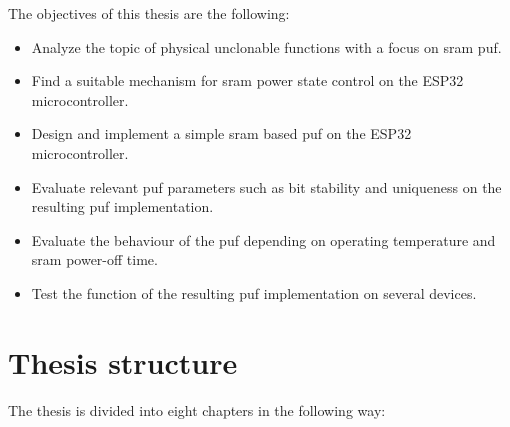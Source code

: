 The objectives of this thesis are the following:

\begin{itemize}
    \item Analyze the topic of physical unclonable functions with a focus on \gls{sram} \gls{puf}.
    \item Find a suitable mechanism for \gls{sram} power state control on the ESP32 microcontroller.
    \item Design and implement a simple \gls{sram} based \gls{puf} on the ESP32 microcontroller.
    \item Evaluate relevant \gls{puf} parameters such as bit stability and uniqueness on the resulting \gls{puf} implementation.
    \item Evaluate the behaviour of the \gls{puf} depending on operating temperature and \gls{sram} power-off time.
    \item Test the function of the resulting \gls{puf} implementation on several devices.
\end{itemize}

\section*{Thesis structure}
{}

The thesis is divided into eight chapters in the following way:

\newcommand\litem[1]{\item{\bfseries #1,\\}}

